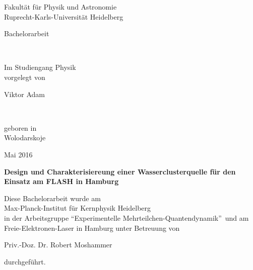 
\thispagestyle{empty}
\begin{center}
  \renewcommand{\baselinestretch}{2.00}
  \Large\sffamily 
  Fakultät für Physik und Astronomie\\
  \large 
  Ruprecht-Karls-Universität Heidelberg
  \par\vfill\normalfont
  \begin{Large}Bachelorarbeit\end{Large}\\
\begin{normalsize}  Im Studiengang Physik\\
  vorgelegt von\\\end{normalsize}
  \begin{Large}Viktor Adam\end{Large}\\
\begin{normalsize}  geboren in\\
  Wolodarskoje \\\end{normalsize}
  \begin{Large}Mai 2016\end{Large}
\end{center}


\cleardoublepage
\thispagestyle{empty}

\begin{center}
  \renewcommand{\baselinestretch}{1.50}
  \Large\bfseries\sffamily
    Design und Charakterisiereung einer Wasserclusterquelle für den Einsatz am FLASH in Hamburg\\
  \vfill
  \normalfont
\begin{normalsize}  Diese Bachelorarbeit wurde am \\
  Max-Planck-Institut für Kernphysik Heidelberg \\
  in der Arbeitsgruppe \enquote{Experimentelle Mehrteilchen-Quantendynamik}\ und am Freie-Elektronen-Laser in Hamburg unter Betreuung von \\\end{normalsize}
   Priv.-Doz. Dr. Robert Moshammer \\
 \begin{normalsize}  durchgeführt.\end{normalsize}
\end{center} %
\vspace{5\baselineskip}

\renewcommand{\baselinestretch}{1.00}\normalsize

\cleardoublepage

